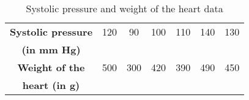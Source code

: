 \begin{table}[h!]
\centering
\begin{tabular}{|c|*{6}{c|}}
\hline
\textbf{Systolic pressure} & 120 & 90 & 100 & 110 & 140 & 130 \\
\textbf{(in mm Hg)} & & & & & & \\
\hline
\textbf{Weight of the} & 500 & 300 & 420 & 390 & 490 & 450 \\
\textbf{heart (in g)} & & & & & & \\
\hline
\end{tabular}
\caption{Systolic pressure and weight of the heart data}
\end{table}